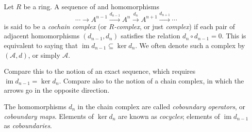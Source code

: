 \documentclass[12pt]{article}
\DeclareMathOperator{\im}{im}
\begin{document}

Let $R$ be a ring.
A sequence of  and homomorphisms
\[
 \cdots \rightarrow
 A^{n-1} \xrightarrow{d_{n-1}} A^n \xrightarrow{d_n} A^{n+1} \xrightarrow{d_{n+1}}
 \cdots
\]
is said to be a \emph{cochain complex}
(or \emph{$R$-complex}, or just \emph{complex})
if each pair of adjacent homomorphisms $(d_{n-1}, d_n)$
satisfies the relation $d_n\circ d_{n-1} = 0$.
This is equivalent to saying that
$\im d_{n-1} \subseteq \ker d_n$.
We often denote such a complex by $(\mathcal{A}, d)$, or simply $\mathcal{A}$.

Compare this to the notion of an exact sequence,
which requires $\im d_{n-1} = \ker d_n$. Compare also to the notion of a chain complex, in which the arrows go in the opposite direction.

The homomorphisms $d_n$ in the chain complex
are called \emph{coboundary operators}, or \emph{coboundary maps}. Elements of $\ker d_n$ are known as \emph{cocycles}; elements of $\im d_{n-1}$ as \emph{coboundaries}.
\end{document}
